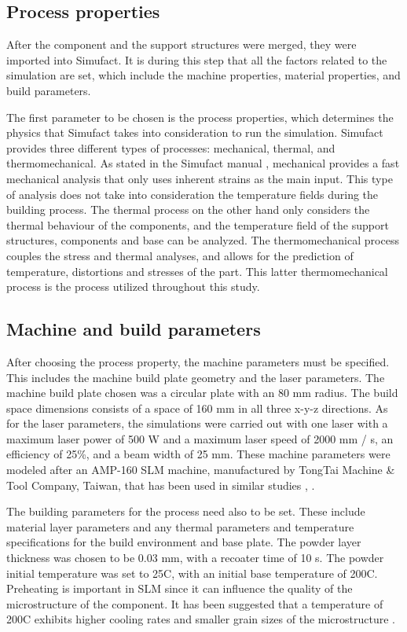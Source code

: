 \documentclass[../main.tex]{subfiles}
\begin{document}
\subsection{Process properties}

After the component and the support structures were merged, they were imported into Simufact. It is during this step that all the factors related to the simulation are set, which include the machine properties, material properties, and build parameters. 

The first parameter to be chosen is the process properties, which determines the physics that Simufact takes into consideration to run the simulation. Simufact provides three different types of processes: mechanical, thermal, and thermomechanical. As stated in the Simufact manual \cite{hexagonabProcessPropertiesInfosheet}, mechanical provides a fast mechanical analysis that only uses inherent strains as the main input. This type of analysis does not take into consideration the temperature fields during the building process. The thermal process on the other hand only considers the thermal behaviour of the components, and the temperature field of the support structures, components and base can be analyzed. The thermomechanical process couples the stress and thermal analyses, and allows for the prediction of temperature, distortions and stresses of the part. This latter thermomechanical process is the process utilized throughout this study.

\subsection{Machine and build parameters}\label{ch:params}

After choosing the process property, the machine parameters must be specified. This includes the machine build plate geometry and the laser parameters. The machine build plate chosen was a circular plate with an 80 mm radius. The build space dimensions consists of a space of 160 mm in all three x-y-z directions. As for the laser parameters, the simulations were carried out with one laser with a maximum laser power of 500 W and a maximum laser speed of 2000 mm / s, an efficiency of 25\%, and a beam width of 25 mm. These machine parameters were modeled after an AMP-160 SLM machine, manufactured by TongTai Machine \& Tool Company, Taiwan, that has been used in similar studies \cite{chungpei-hsuStudyLatticeSupport2024}, \cite{chungEvaluationPredictionThermal2024a}.

The building parameters for the process need also to be set. These include material layer parameters and any thermal parameters and temperature specifications for the build environment and base plate. The powder layer thickness was chosen to be 0.03 mm, with a recoater time of 10 s. The powder initial temperature was set to 25\degree C, with an initial base temperature of 200\degree C. Preheating is important in SLM since it can influence the quality of the microstructure of the component. It has been suggested that a temperature of 200\degree C exhibits higher cooling rates and smaller grain sizes of the microstructure \cite{chowdhuryEffectsPreheatingThermal2024}.
\end{document}
